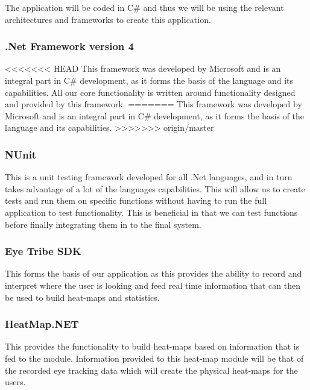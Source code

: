 The application will be coded in C\# and thus we will be using the relevant architectures and frameworks to create this application.

\subsubsection{.Net Framework version 4}
\begin{flushleft}
<<<<<<< HEAD
	This framework was developed by Microsoft and is an integral part in C\# development, as it forms the basis of the language and its capabilities. All our core functionality is written around functionality designed and provided by this framework.
=======
	This framework was developed by Microsoft and is an integral part in C\# development, as it forms the basis of the language and its capabilities.
>>>>>>> origin/master
\end{flushleft}

\subsubsection{NUnit}
\begin{flushleft}
This is a unit testing framework developed for all .Net languages, and in turn takes advantage of a lot of the languages capabilities. This will allow us to create tests and run them on specific functions without having to run the full application to test functionality. This is beneficial in that we can test functions before finally integrating them in to the final system.
\end{flushleft}

\subsubsection{Eye Tribe SDK}
\begin{flushleft}
This forms the basis of our application as this provides the ability to record and interpret where the user is looking and feed real time information that can then be used to build heat-maps and statistics.
\end{flushleft}

\subsubsection{HeatMap.NET}
\begin{flushleft}
This provides the functionality to build heat-maps based on information that is fed to the module. Information provided to this heat-map module will be that of the recorded eye tracking data which will create the physical heat-maps for the users.
\end{flushleft}

